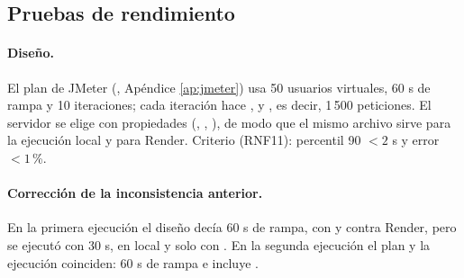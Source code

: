 
\subsection{Pruebas de rendimiento}

\paragraph{Diseño.} El plan de JMeter (, Apéndice \ref{ap:jmeter}) usa 50 usuarios virtuales, 60 s de rampa y 10 iteraciones; cada iteración hace ,  y , es decir, 1\,500 peticiones. El servidor se elige con propiedades (, , ), de modo que el mismo archivo sirve para la ejecución local y para Render. Criterio (RNF11): percentil 90 $< 2$ s y error $< 1$\,\%.

\paragraph{Corrección de la inconsistencia anterior.} En la primera ejecución el diseño decía 60 s de rampa, con  y contra Render, pero se ejecutó con 30 s, en local y solo con . En la segunda ejecución el plan y la ejecución coinciden: 60 s de rampa e incluye .

